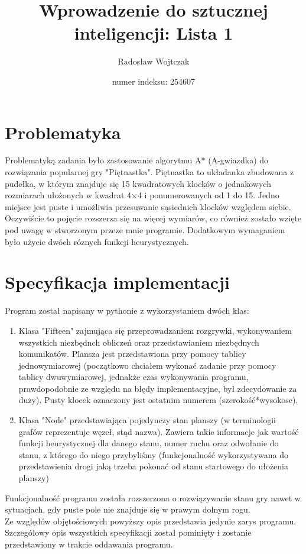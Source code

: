 \documentclass[a4paper,14pt]{report}
\title{Wprowadzenie do sztucznej inteligencji: Lista 1}
\author{Radosław Wojtczak}
\date{numer indeksu: 254607}
\begin{document}
\maketitle
\section{Problematyka}
Problematyką zadania było zastosowanie algorytmu A* (A-gwiazdka) do rozwiązania popularnej gry "Piętnastka". Piętnastka to układanka zbudowana z pudełka, w którym znajduje się 15 kwadratowych klocków o jednakowych rozmiarach ułożonych w kwadrat 4×4 i ponumerowanych od 1 do 15. Jedno miejsce jest puste i umożliwia przesuwanie sąsiednich klocków względem siebie. Oczywiście to pojęcie rozszerza się na więcej wymiarów, co również zostało wzięte pod uwagę w stworzonym przeze mnie programie.
Dodatkowym wymaganiem było użycie dwóch róznych funkcji heurystycznych.

\section{Specyfikacja implementacji}
Program został napisany w pythonie z wykorzystaniem dwóch klas:
\begin{enumerate}
	\item Klasa "Fifteen" zajmująca się przeprowadzaniem rozgrywki, wykonywaniem wszystkich niezbędnch obliczeń oraz przedstawianiem niezbędnych komunikatów. Plansza jest przedstawiona przy pomocy tablicy jednowymiarowej (początkowo chciałem wykonać zadanie przy pomocy tablicy dwuwymiarowej, jednakże czas wykonywania programu, prawdopodobnie ze względu na błędy implementacyjne, był zdecydowanie za duży). Pusty klocek oznaczony jest ostatnim numerem (szerokość*wysokosc).
	\item Klasa "Node" przedstawiająca pojedynczy stan planszy (w terminologii grafów reprezentuje węzeł, stąd nazwa). Zawiera takie informacje jak wartość funkcji heurystycznej dla danego stanu, numer ruchu oraz odwołanie do stanu, z którego do niego przybyliśmy (funkcjonalność wykorzystywana do przedstawienia drogi jaką trzeba pokonać od stanu startowego do ułożenia planszy)
\end{enumerate}
Funkcjonalność programu została rozszerzona o rozwiązywanie stanu gry nawet w sytuacjach, gdy puste pole nie znajduje się w prawym dolnym rogu. \\
Ze względów objętościowych powyższy opis przedstawia jedynie zarys programu. Szczegółowy opis wszystkich specyfikacji został pominięty i zostanie przedstawiony w trakcie oddawania programu.
\end{document}
